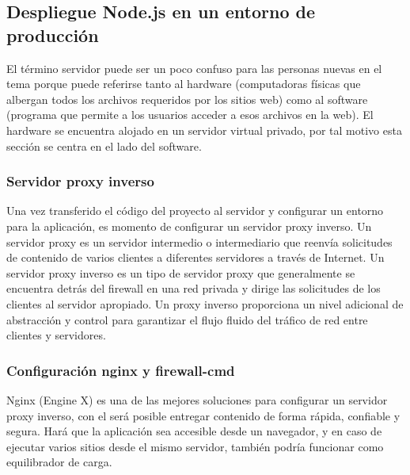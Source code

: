 \subsection{Despliegue Node.js en un entorno de producción}
El término servidor puede ser un poco confuso para las personas nuevas en el tema porque puede referirse tanto al hardware (computadoras físicas que albergan todos los archivos requeridos por los sitios web) como al software (programa que permite a los usuarios acceder a esos archivos en la web). El hardware se encuentra alojado en un servidor virtual privado, por tal motivo esta sección se centra en el lado del software.

\subsubsection{Servidor proxy inverso}
Una vez transferido el código del proyecto al servidor y configurar un entorno para la aplicación, es momento de configurar un servidor proxy inverso. Un servidor proxy es un servidor intermedio o intermediario que reenvía solicitudes de contenido de varios clientes a diferentes servidores a través de Internet. Un servidor proxy inverso es un tipo de servidor proxy que generalmente se encuentra detrás del firewall en una red privada y dirige las solicitudes de los clientes al servidor apropiado. Un proxy inverso proporciona un nivel adicional de abstracción y control para garantizar el flujo fluido del tráfico de red entre clientes y servidores.

\subsubsection{Configuración nginx y firewall-cmd}
Nginx (Engine X) es una de las mejores soluciones para configurar un servidor proxy inverso, con el será posible entregar contenido de forma rápida, confiable y segura. Hará que la aplicación sea accesible desde un navegador, y en caso de ejecutar varios sitios desde el mismo servidor, también podría funcionar como equilibrador de carga.
\vspace{0.8cm}

